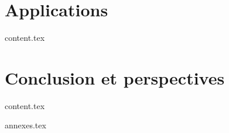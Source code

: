 \documentclass{bredele}
\begin{document}
\part{Applications}

\clearemptydoublepage
{content.tex}


\part{Conclusion et perspectives}


\clearemptydoublepage
{content.tex}



\clearemptydoublepage
\renewcommand{\thesubsection}{\Alph{chapter}}
{annexes.tex}

\frontmatter


\clearemptydoublepage
\backmatter
\printbibliography

\tikzexternaldisable
\end{document}
